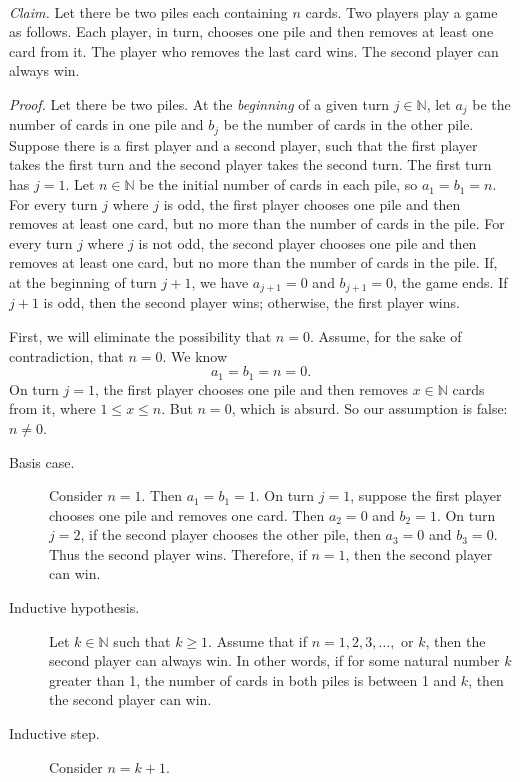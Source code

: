 \documentclass{article}
\theoremstyle{definition}
\begin{document}
\begin{solution}
~\newline

\noindent\textit{Claim. }Let there be two piles each containing $n$ cards. Two players play a game as follows. Each player, in turn, chooses one pile and then removes at least one card from it. The player who removes the last card wins. The second player can always win.\newline

\noindent\textit{Proof. }Let there be two piles. At the \textit{beginning} of a given turn $j\in\mathbb{N}$, let $a_j$ be the number of cards in one pile and $b_j$ be the number of cards in the other pile. Suppose there is a first player and a second player, such that the first player takes the first turn and the second player takes the second turn. The first turn has $j=1$. Let $n\in\mathbb{N}$ be the initial number of cards in each pile, so $a_1=b_1=n$. For every turn $j$ where $j$ is odd, the first player chooses one pile and then removes at least one card, but no more than the number of cards in the pile. For every turn $j$ where $j$ is not odd, the second player chooses one pile and then removes at least one card, but no more than the number of cards in the pile. If, at the beginning of turn $j+1$, we have $a_{j+1}=0$ and $b_{j+1}=0$, the game ends. If $j+1$ is odd, then the second player wins; otherwise, the first player wins.\newline

\noindent First, we will eliminate the possibility that $n=0$. Assume, for the sake of contradiction, that $n=0$. We know
\[a_1=b_1=n=0.\]
On turn $j=1$, the first player chooses one pile and then removes $x\in\mathbb{N}$ cards from it, where $1\leq x\leq n$. But $n=0$, which is absurd. So our assumption is false: $n\neq 0$.

\begin{description}
\item[Basis case.] Consider $n=1$. Then $a_1=b_1=1$. On turn $j=1$, suppose the first player chooses one pile and removes one card. Then $a_2=0$ and $b_2=1$. On turn $j=2$, if the second player chooses the other pile, then $a_3=0$ and $b_3=0$. Thus the second player wins. Therefore, if $n=1$, then the second player can win.
\item[Inductive hypothesis.] Let $k\in\mathbb{N}$ such that $k\geq 1$. Assume that if $n=1,2,3,\dots,\text{ or }k$, then the second player can always win. In other words, if for some natural number $k$ greater than 1, the number of cards in both piles is between 1 and $k$, then the second player can win.
\item[Inductive step.] Consider $n=k+1$.


\end{description}
\end{solution}
\end{document}
